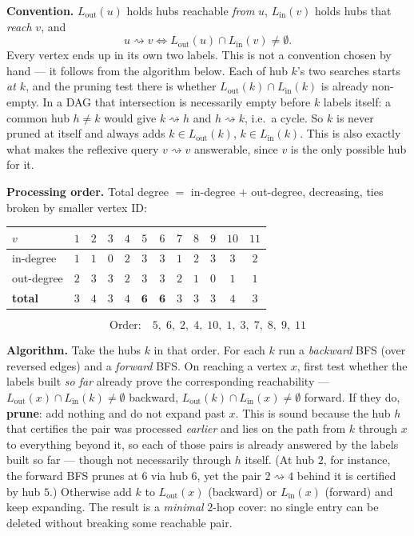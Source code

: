 \documentclass[11pt]{article}
\begin{document}
\noindent\textbf{\color{accent!85!black}Convention.} $L_{\mathrm{out}}(u)$ holds hubs
reachable \emph{from} $u$, $L_{\mathrm{in}}(v)$ holds hubs that \emph{reach} $v$, and
\[
  u\rightsquigarrow v \iff L_{\mathrm{out}}(u)\cap L_{\mathrm{in}}(v)\neq\emptyset .
\]
Every vertex ends up in its own two labels. This is not a convention chosen by hand --- it
follows from the algorithm below. Each of hub $k$'s two searches starts \emph{at $k$}, and
the pruning test there is whether $L_{\mathrm{out}}(k)\cap L_{\mathrm{in}}(k)$ is already
non-empty. In a DAG that intersection is necessarily empty before $k$ labels itself: a
common hub $h\neq k$ would give $k\rightsquigarrow h$ and $h\rightsquigarrow k$, i.e.\ a
cycle. So $k$ is never pruned at itself and always adds
$k\in L_{\mathrm{out}}(k)$, $k\in L_{\mathrm{in}}(k)$. This is also exactly what makes the
reflexive query $v\rightsquigarrow v$ answerable, since $v$ is the only possible hub for it.

\noindent\textbf{\color{accent!85!black}Processing order.} Total degree $=$ in-degree $+$
out-degree, decreasing, ties broken by smaller vertex ID:

\begin{center}
\begin{tabular}{l c c c c c c c c c c c}
\toprule
\rowcolor{white}
$v$ & $1$ & $2$ & $3$ & $4$ & $5$ & $6$ & $7$ & $8$ & $9$ & $10$ & $11$ \\
\midrule
in-degree  & $1$ & $1$ & $0$ & $2$ & $3$ & $3$ & $1$ & $2$ & $3$ & $3$ & $2$ \\
out-degree & $2$ & $3$ & $3$ & $2$ & $3$ & $3$ & $2$ & $1$ & $0$ & $1$ & $1$ \\
\textbf{total} & $3$ & $4$ & $3$ & $4$ & $\mathbf{6}$ & $\mathbf{6}$ & $3$ & $3$ & $3$ & $4$ & $3$ \\
\bottomrule
\end{tabular}
\end{center}

\[
  \text{Order:}\quad 5,\;6,\;2,\;4,\;10,\;1,\;3,\;7,\;8,\;9,\;11
\]

\noindent\textbf{\color{accent!85!black}Algorithm.} Take the hubs $k$ in that order. For
each $k$ run a \emph{backward} BFS (over reversed edges) and a \emph{forward} BFS. On
reaching a vertex $x$, first test whether the labels built \emph{so far} already prove the
corresponding reachability --- $L_{\mathrm{out}}(x)\cap L_{\mathrm{in}}(k)\neq\emptyset$
backward, $L_{\mathrm{out}}(k)\cap L_{\mathrm{in}}(x)\neq\emptyset$ forward. If they do,
\textbf{prune}: add nothing and do not expand past $x$. This is sound because the hub $h$
that certifies the pair was processed \emph{earlier} and lies on the path from $k$ through
$x$ to everything beyond it, so each of those pairs is already answered by the labels built
so far --- though not necessarily through $h$ itself. (At hub $2$, for instance, the
forward BFS prunes at $6$ via hub $6$, yet the pair $2\rightsquigarrow 4$ behind it is
certified by hub $5$.) Otherwise add $k$ to $L_{\mathrm{out}}(x)$
(backward) or $L_{\mathrm{in}}(x)$ (forward) and keep expanding. The result is a
\emph{minimal} $2$-hop cover: no single entry can be deleted without breaking some
reachable pair.
\end{document}
